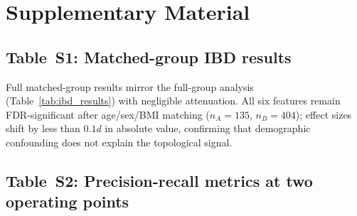 \section*{Supplementary Material}
\label{sec:supplementary}

\setcounter{table}{0}
\renewcommand{\thetable}{S\arabic{table}}
\setcounter{figure}{0}
\renewcommand{\thefigure}{S\arabic{figure}}

\subsection*{Table~S1: Matched-group IBD results}

Full matched-group results mirror the full-group analysis
(Table~\ref{tab:ibd_results}) with negligible attenuation.
All six features remain FDR-significant after age/sex/BMI matching
($n_A = 135$, $n_B = 404$); effect sizes shift by less than $0.1d$
in absolute value, confirming that demographic confounding does not
explain the topological signal.

\subsection*{Table~S2: Precision-recall metrics at two operating points}


